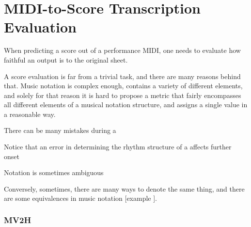 \chapter{MIDI-to-Score Transcription Evaluation}

When predicting a score out of a performance MIDI, one needs to evaluate how faithful an output is to the original sheet.

A score evaluation is far from a trivial task, and there are many reasons behind that. Music notation is complex enough, contains a variety of different elements, and solely for that reason it is hard to propose a metric that fairly encompasses all different elements of a musical notation structure, and assigns a single value in a reasonable way.

There can be many mistakes during a

Notice that an error in determining the rhythm structure of a affects further onset

Notation is sometimes ambiguous

Conversely, sometimes, there are many ways to denote the same thing, and there are some equivalences in music notation [example \missing].

\subsection{MV2H}

\cite{McLeod2018}

\missing
